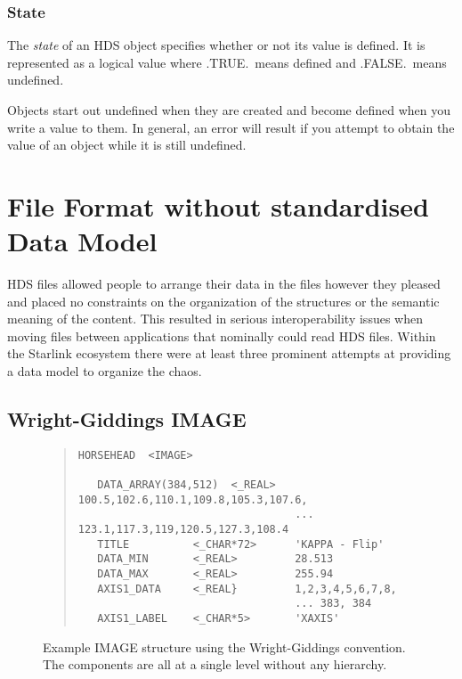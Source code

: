 \documentclass[final,authoryear,5p,times,twocolumn]{elsarticle}
\begin{document}
{\subsubsection{State}

The \emph{state} of an HDS object specifies whether or not its value is
defined. It is represented as a logical value where .TRUE.\ means
defined and .FALSE.\ means undefined.

Objects start out undefined when they are created and become defined
when you write a value to them. In general, an error will result if
you attempt to obtain the value of an object while it is still
undefined.


\section{File Format without standardised Data Model}

HDS files allowed people to arrange their data in the files however
they pleased and placed no constraints on the organization of the
structures or the semantic meaning of the content. This resulted in
serious interoperability issues when moving files between applications
that nominally could read HDS files. Within the Starlink ecosystem
there were at least three prominent attempts at providing a data model
to organize the chaos.

\subsection{Wright-Giddings IMAGE}

\begin{figure*}
\begin{minipage}{\textwidth}
\begin{quote}
\small
\begin{verbatim}
HORSEHEAD  <IMAGE>

   DATA_ARRAY(384,512)  <_REAL>   100.5,102.6,110.1,109.8,105.3,107.6,
                                  ... 123.1,117.3,119,120.5,127.3,108.4
   TITLE          <_CHAR*72>      'KAPPA - Flip'
   DATA_MIN       <_REAL>         28.513
   DATA_MAX       <_REAL>         255.94
   AXIS1_DATA     <_REAL}         1,2,3,4,5,6,7,8,
                                  ... 383, 384
   AXIS1_LABEL    <_CHAR*5>       'XAXIS'
\end{verbatim}
\end{quote}
\caption{Example IMAGE structure using the Wright-Giddings
  convention. The components are all at a single level without any hierarchy.}
\end{minipage}
\end{figure*}

}
\end{document}
